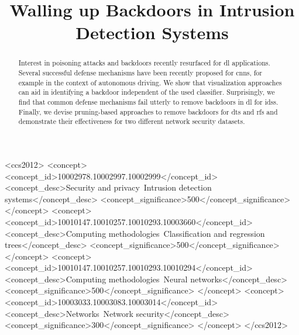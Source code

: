 \documentclass[9pt,sigconf,letterpaper,dvipsnames\ifx\removeHeaders\tempYes ,nonacm\fi]{acmart}
\begin{document}
\title{Walling up Backdoors in Intrusion Detection Systems}



\begin{abstract}
Interest in poisoning attacks and backdoors recently resurfaced for \gls{dl} applications. Several successful defense mechanisms have been recently proposed for \glspl{cnn}, for example in the context of autonomous driving. We show that visualization approaches can aid in identifying a backdoor independent of the used classifier. Surprisingly, we find that common defense mechanisms fail utterly to remove backdoors in \gls{dl} for \glspl{ids}. Finally, we devise pruning-based approaches to remove backdoors for \glspl{dt} and \glspl{rf} and demonstrate their effectiveness for two different %
network security datasets.
\end{abstract}

\begin{CCSXML}
<ccs2012>
<concept>
<concept_id>10002978.10002997.10002999</concept_id>
<concept_desc>Security and privacy~Intrusion detection systems</concept_desc>
<concept_significance>500</concept_significance>
</concept>
<concept>
<concept_id>10010147.10010257.10010293.10003660</concept_id>
<concept_desc>Computing methodologies~Classification and regression trees</concept_desc>
<concept_significance>500</concept_significance>
</concept>
<concept>
<concept_id>10010147.10010257.10010293.10010294</concept_id>
<concept_desc>Computing methodologies~Neural networks</concept_desc>
<concept_significance>500</concept_significance>
</concept>
<concept>
<concept_id>10003033.10003083.10003014</concept_id>
<concept_desc>Networks~Network security</concept_desc>
<concept_significance>300</concept_significance>
</concept>
</ccs2012>
\end{CCSXML}
\end{document}
